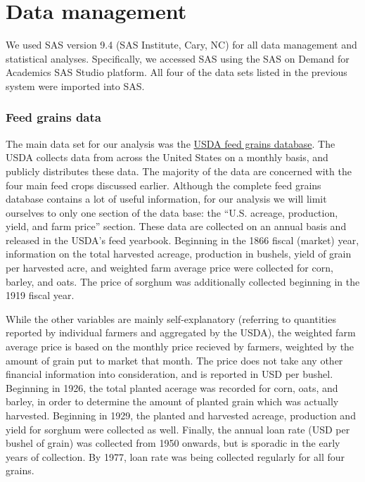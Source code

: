 \documentclass[11pt]{article}
\begin{document}
\section*{Data management}

We used SAS version 9.4 (SAS Institute, Cary, NC) for all data management and
statistical analyses. Specifically, we accessed SAS using the SAS on Demand for
Academics SAS Studio platform. All four of the data sets listed in the previous
system were imported into SAS.

\subsubsection*{Feed grains data}

The main data set for our analysis was the
\href{https://www.ers.usda.gov/data-products/feed-grains-database/}{USDA feed
	grains database}. The USDA collects data from across the United States on a
monthly basis, and publicly distributes these data. The majority of the data
are concerned with the four main feed crops discussed earlier. Although the
complete feed grains database contains a lot of useful information, for our
analysis we will limit ourselves to only one section of the data base: the
``U.S. acreage, production, yield, and farm price'' section. These data are
collected on an annual basis and released in the USDA's feed yearbook.
Beginning in the 1866 fiscal (market) year, information on the total harvested
acreage, production in bushels, yield of grain per harvested acre, and weighted
farm average price were collected for corn, barley, and oats. The price of
sorghum was additionally collected beginning in the 1919 fiscal year.

While the other variables are mainly self-explanatory (referring to quantities
reported by individual farmers and aggregated by the USDA), the weighted farm
average price is based on the monthly price recieved by farmers, weighted by
the amount of grain put to market that month. The price does not take any other
financial information into consideration, and is reported in USD per bushel.
Beginning in 1926, the total planted acerage was recorded for corn, oats, and
barley, in order to determine the amount of planted grain which was actually
harvested. Beginning in 1929, the planted and harvested acreage, production and
yield for sorghum were collected as well. Finally, the annual loan rate (USD
per bushel of grain) was collected from 1950 onwards, but is sporadic in the
early years of collection. By 1977, loan rate was being collected regularly for
all four grains.
\end{document}
